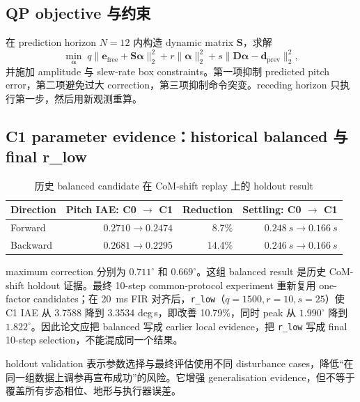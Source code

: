 \documentclass[UTF8,11pt,a4paper]{ctexart}
\newcommand{\code}[1]{\texttt{#1}}
\begin{document}
\subsection{QP objective 与约束}

在 prediction horizon $N=12$ 内构造 dynamic matrix $\bm S$，求解
\begin{equation}
 \min_{\bm\alpha}\;
 q\lVert\bm e_{\mathrm{free}}+\bm S\bm\alpha\rVert_2^2
 +r\lVert\bm\alpha\rVert_2^2
 +s\lVert\bm D\bm\alpha-\bm d_{\mathrm{prev}}\rVert_2^2,
 \label{eq:qp}
\end{equation}
并施加 amplitude 与 slew-rate box constraints。第一项抑制 predicted pitch error，第二项避免过大 correction，第三项抑制命令突变。receding horizon 只执行第一步，然后用新观测重算。

\subsection{C1 parameter evidence：historical balanced 与 final r\_low}\label{sec:balanced}

\begin{table}[htbp]
\centering
\caption{历史 balanced candidate 在 CoM-shift replay 上的 holdout result}
\begin{tabular}{@{}lrrr@{}}
\toprule
Direction & Pitch IAE: C0 $\rightarrow$ C1 & Reduction & Settling: C0 $\rightarrow$ C1 \\
\midrule
Forward & $0.2710\rightarrow0.2474$ & 8.7\% & $\SI{0.248}{s}\rightarrow\SI{0.166}{s}$ \\
Backward & $0.2681\rightarrow0.2295$ & 14.4\% & $\SI{0.246}{s}\rightarrow\SI{0.166}{s}$ \\
\bottomrule
\end{tabular}
\end{table}

maximum correction 分别为 $0.711^\circ$ 和 $0.669^\circ$。这组 balanced result 是历史 CoM-shift holdout 证据。最终 10-step common-protocol experiment 重新复用 one-factor candidates；在 \SI{20}{ms} FIR 对齐后，\code{r\_low}（$q=1500,r=10,s=25$）使 C1 IAE 从 3.7588 降到 3.3534 deg\,s，即改善 10.79\%，同时 peak 从 $1.990^\circ$ 降到 $1.822^\circ$。因此论文应把 balanced 写成 earlier local evidence，把 \code{r\_low} 写成 final 10-step selection，不能混成同一个结果。

holdout validation 表示参数选择与最终评估使用不同 disturbance cases，降低“在同一组数据上调参再宣布成功”的风险。它增强 generalisation evidence，但不等于覆盖所有步态相位、地形与执行器误差。
\end{document}
